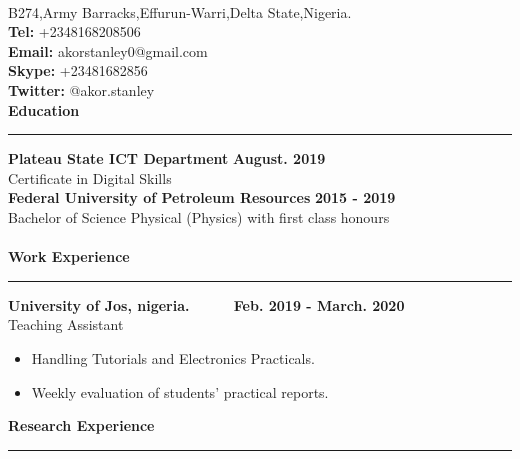 \documentclass[a4paper]{article}
\begin{document}
	\\
	 B274,Army Barracks,Effurun-Warri,Delta State,Nigeria.\\
	\textbf{Tel:}  +2348168208506\\
	\textbf{Email:} akorstanley0@gmail.com\\
	\textbf{Skype:} +23481682856\\
	\textbf{Twitter:} @akor.stanley\\
	
	\noindent\textbf{Education}
	\\
	\vspace{-2.8mm}
	\hrule 
	\vspace{2.5mm}
	
	\noindent \textbf{Plateau State ICT Department}   \qquad \qquad \qquad \qquad \qquad \qquad \qquad \qquad \qquad \qquad \qquad \qquad \qquad \textbf{August. 2019}\\ Certificate in Digital Skills  \\
	
	
	
	\noindent \textbf{Federal University of Petroleum Resources} \qquad \qquad \qquad \qquad \qquad \qquad \qquad \qquad \qquad \quad \qquad  \textbf{2015 - 2019} \\
	Bachelor of Science Physical (Physics) with first class honours\\\\
	\textbf{Work Experience}
	\\
	\vspace{-2.8mm}
	\hrule 
	\vspace{2.5mm}
	

	\noindent \textbf{University of Jos, nigeria. }  \qquad  \qquad \qquad\qquad \qquad\qquad \qquad\qquad \ \ \ \qquad \qquad \ \  \textbf{ Feb. 2019 - March. 2020} 
	\\
	 Teaching Assistant 
		\begin{multicols}{2}
		\begin{itemize}
			\item Handling Tutorials and Electronics Practicals.
			\item Weekly evaluation of students' practical reports.
		\end{itemize}
	\end{multicols}
	
	\noindent \textbf{Research Experience}
	\\
	\vspace{-2.8mm}
	\hrule 
		\vspace{2.5mm}
		
\end{document}
